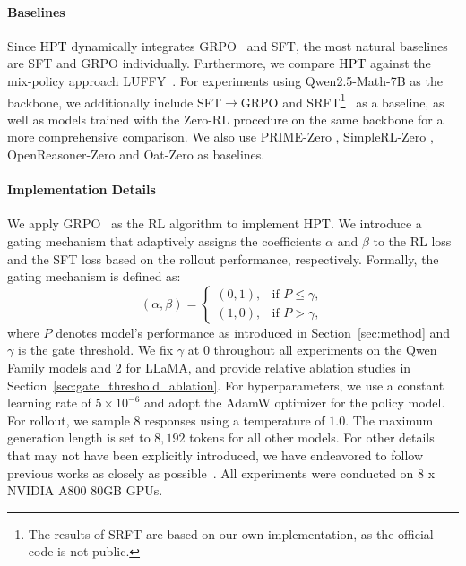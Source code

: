 \documentclass{article} %
\newcommand{\0}{\mathbb{0}}
\newcommand{\1}{\mathbb{1}}
\newcommand{\mot}{\textcolor{black}{HPT}\xspace}
\begin{document}
\paragraph{Baselines}
Since \mot dynamically integrates GRPO~\citep{shao2024deepseekmath} and SFT, the most natural baselines are SFT and GRPO individually.
Furthermore, we compare \mot against the mix-policy approach LUFFY~\citep{yan2025learning}.
For experiments using Qwen2.5-Math-7B as the backbone, we additionally include SFT$\rightarrow$GRPO and SRFT\footnote{The results of SRFT are based on our own implementation, as the official code is not public.}~\citep{fu2025srft} as a baseline, as well as models trained with the Zero-RL procedure on the same backbone for a more comprehensive comparison. We also use PRIME-Zero \citep{cui2025process}, SimpleRL-Zero \citep{zeng2025simplerl}, OpenReasoner-Zero \citep{hu2025openreasonerzeroopensourceapproach} and Oat-Zero \citep{liu2025understanding} as baselines.


\paragraph{Implementation Details}
We apply GRPO~\citep{shao2024deepseekmath} as the RL algorithm to implement \mot.
We introduce a gating mechanism that adaptively assigns the coefficients $\alpha$ and $\beta$ to the RL loss and the SFT loss based on the rollout performance, respectively.
Formally, the gating mechanism is defined as:
\[
(\alpha, \beta) =
\begin{cases}
(0, 1), & \text{if } P \leq \gamma, \\[6pt]
(1, 0), & \text{if } P > \gamma,
\end{cases}
\]
where $P$ denotes model's performance as introduced in Section~\ref{sec:method} and $\gamma$ is the gate threshold.
We fix $\gamma$ at $0$ throughout all experiments on the Qwen Family models and $2$ for LLaMA, and provide relative ablation studies in Section~\ref{sec:gate_threshold_ablation}.
For hyperparameters, we use a constant learning rate of $5 \times 10^{-6}$ and adopt the AdamW optimizer for the policy model.
For rollout, we sample $8$ responses using a temperature of $1.0$.
The maximum generation length is set to $8,192$ tokens for all other models.
For other details that may not have been explicitly introduced, we have endeavored to follow previous works as closely as possible~\citep{zhao2025learning,zuo2025ttrl}.
All experiments were conducted on 8 x NVIDIA A800 80GB GPUs.
\end{document}
